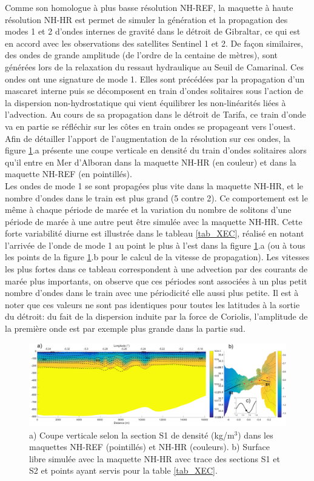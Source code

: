 \documentclass[a4paper,11pt]{report}
\begin{document}
Comme son homologue à plus basse résolution NH-REF, la maquette à haute résolution NH-HR est permet de simuler la génération et la propagation des modes 1 et 2 d'ondes internes de gravité dans le détroit de Gibraltar, ce qui est en accord avec les observations des satellites Sentinel 1 et 2. De façon similaires, des ondes de grande amplitude (de l'ordre de la centaine de mètres), sont générées lors de la relaxation du ressaut hydraulique au Seuil de Camarinal. Ces ondes ont une signature de mode 1. Elles sont précédées par la propagation d'un mascaret interne puis se décomposent en train d'ondes solitaires sous l'action de la dispersion non-hydrostatique qui vient équilibrer les non-linéarités liées à l'advection. Au cours de sa propagation dans le détroit de Tarifa, ce train d'onde va en partie se réfléchir sur les côtes en train ondes se propageant vers l'ouest. Afin de détailler l'apport de l'augmentation de la résolution sur ces ondes, la figure \ref{fig_mod1_HR-REF}.a présente une coupe verticale en densité du train d'ondes solitaires alors qu'il entre en Mer d'Alboran dans la maquette NH-HR (en couleur) et dans la maquette NH-REF (en pointillés). \\
Les ondes de mode 1 se sont propagées plus vite dans la maquette NH-HR, et le nombre d'ondes dans le train est plus grand (5 contre 2). Ce comportement est le même à chaque période de marée et la variation du nombre de solitons d'une période de marée à une autre peut être simulée avec la maquette NH-HR. Cette forte variabilité diurne est illustrée dans le tableau \ref{tab_XEC}, réalisé en notant l'arrivée de l'onde de mode 1 au point le plus à l'est dans la figure \ref{fig_mod1_HR-REF}.a (ou à tous les points de la figure \ref{fig_mod1_HR-REF}.b pour le calcul de la vitesse de propagation). Les vitesses les plus fortes dans ce tableau correspondent à une advection par des courants de marée plus importants, on observe que ces périodes sont associées à un plus petit nombre d'ondes dans le train avec une périodicité elle aussi plus petite. Il est à noter que ces valeurs ne sont pas identiques pour toutes les latitudes à la sortie du détroit: du fait de la dispersion induite par la force de Coriolis, l'amplitude de la première onde est par exemple plus grande dans la partie sud.

\begin{figure}[!h]
 	\includegraphics[width=\textwidth]{media/comp_train_it36_IE2_hr-vhr.png}
 	\caption{a) Coupe verticale selon la section S1 de densité (kg/m$^3$) dans les maquettes NH-REF (pointillés) et NH-HR (couleurs). b) Surface libre simulée avec la maquette NH-HR avec trace des sections S1 et S2 et points ayant servis pour la table \ref{tab_XEC}.}
 	\label{fig_mod1_HR-REF}
\end{figure}
\end{document}
